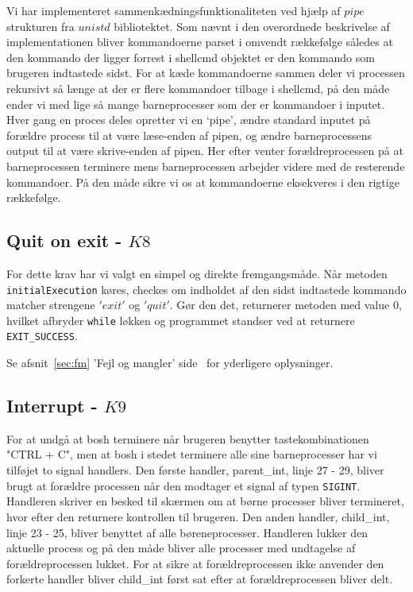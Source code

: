 \documentclass{article}
\begin{document}
Vi har implementeret sammenkædningsfunktionaliteten ved hjælp af $pipe$ strukturen fra $unistd$ bibliotektet. Som nævnt i den overordnede beskrivelse af implementationen bliver kommandoerne parset i omvendt rækkefølge således at den kommando der ligger forrest i shellcmd objektet er den kommando som brugeren indtastede sidst. For at kæde kommandoerne sammen deler vi processen rekursivt så længe at der er flere kommandoer tilbage i shellcmd, på den måde ender vi med lige så mange barneprocesser som der er kommandoer i inputet. Hver gang en proces deles opretter vi en ‘pipe’, ændre standard inputet på forældre process til at være læse-enden af pipen, og ændre barneprocessens output til at være skrive-enden af pipen. Her efter venter forældreprocessen på at barneprocessen terminere mens barneprocessen arbejder videre med de resterende kommandoer. På den måde sikre vi os at kommandoerne eksekveres i den rigtige rækkefølge. 

\subsection{Quit on exit - $K8$}
For dette krav har vi valgt en simpel og direkte fremgangsmåde. Når metoden \texttt{initialExecution} køres, checkes om indholdet af den sidst indtastede kommando matcher strengene $'exit'$ og $'quit'$. Gør den det, returnerer metoden med value $0$, hvilket afbryder \texttt{while} løkken og programmet standser ved at returnere \texttt{EXIT\_SUCCESS}.

Se afsnit~\ref{sec:fm} 'Fejl og mangler' side~\pageref{sec:fm} for yderligere oplysninger.

\subsection{Interrupt - $K9$}
For at undgå at bosh terminere når brugeren benytter tastekombinationen "CTRL + C", men at bosh i stedet terminere alle sine barneprocesser har vi tilføjet to signal handlers. Den første handler, parent\_int, linje 27 - 29, bliver brugt at forældre processen når den modtager et signal af typen \texttt{SIGINT}. Handleren skriver en besked til skærmen om at børne processer bliver termineret, hvor efter den returnere kontrollen til brugeren. 
Den anden handler, child\_int, linje 23 - 25, bliver benyttet af alle børeneprocesser. Handleren lukker den aktuelle process og på den måde bliver alle processer med undtagelse af forældreprocessen lukket. For at sikre at forældreprocessen ikke anvender den forkerte handler bliver child\_int først sat efter at forældreprocessen bliver delt.\\
\end{document}
